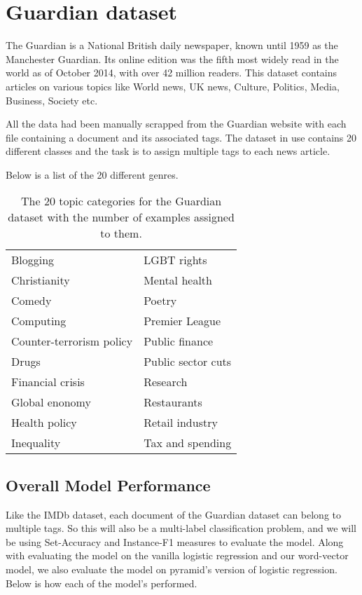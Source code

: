 \newpage
\section{Guardian dataset}

The Guardian is a National British daily newspaper, known until 1959 as the Manchester Guardian. Its online edition was the fifth most widely read in the world as of October 2014, with over 42 million readers. This dataset contains articles on various topics like World news, UK news, Culture, Politics, Media, Business, Society etc.

All the data had been manually scrapped from the Guardian website with each file containing a document and its associated tags. The dataset in use contains 20 different classes and the task is to assign multiple tags to each news article.

Below is a list of the 20 different genres.

\begin{table}[htbp]
\centering
\begin{tabular}{l|l}
Blogging       & LGBT rights    \\
Christianity      & Mental health \\
Comedy     & Poetry       \\
Computing    & Premier League \\
Counter-terrorism policy      & Public finance   \\
Drugs      & Public sector cuts     \\
Financial crisis      & Research   \\
Global enonomy   & Restaurants   \\
Health policy & Retail industry     \\
Inequality     & Tax and spending      
\end{tabular}
\caption{\label{tab:widgets}The 20 topic categories for the Guardian dataset with the number of examples assigned to them.}
\end{table}

\subsection{Overall Model Performance}

Like the IMDb dataset, each document of the Guardian dataset can belong to multiple tags. So this will also be a multi-label classification problem, and we will be using Set-Accuracy and Instance-F1 measures to evaluate the model. Along with evaluating the model on the vanilla logistic regression and our word-vector model, we also evaluate the model on pyramid's version of logistic regression. Below is how each of the model's performed.

